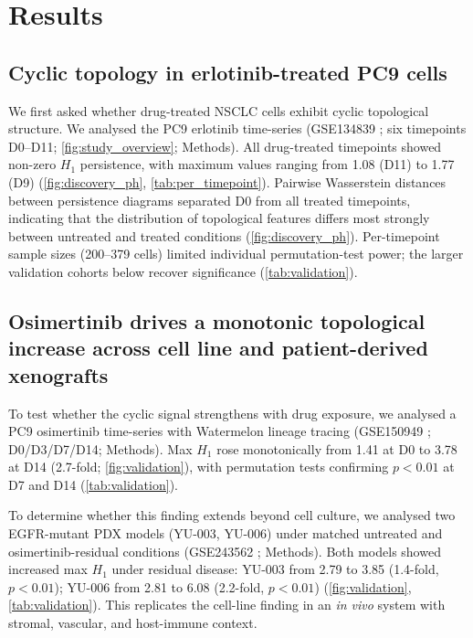 \section{Results}

\subsection*{Cyclic topology in erlotinib-treated PC9 cells}

We first asked whether drug-treated NSCLC cells exhibit cyclic
topological structure. We analysed the PC9 erlotinib time-series
(GSE134839 \citep{aissa2021}; six timepoints D0--D11;
\cref{fig:study_overview}; Methods). All drug-treated timepoints
showed non-zero $H_1$ persistence, with maximum values ranging from
1.08 (D11) to 1.77 (D9) (\cref{fig:discovery_ph},
\cref{tab:per_timepoint}). Pairwise Wasserstein distances between
persistence diagrams separated D0 from all treated timepoints,
indicating that the distribution of topological features differs most
strongly between untreated and treated conditions
(\cref{fig:discovery_ph}). Per-timepoint sample sizes (200--379 cells)
limited individual permutation-test power; the larger validation
cohorts below recover significance (\cref{tab:validation}).

\subsection*{Osimertinib drives a monotonic topological increase across
cell line and patient-derived xenografts}

To test whether the cyclic signal strengthens with drug exposure, we
analysed a PC9 osimertinib time-series with Watermelon lineage tracing
(GSE150949 \citep{oren2021}; D0/D3/D7/D14; Methods). Max $H_1$ rose
monotonically from 1.41 at D0 to 3.78 at D14 (2.7-fold;
\cref{fig:validation}), with permutation tests confirming
$p < 0.01$ at D7 and D14 (\cref{tab:validation}).

To determine whether this finding extends beyond cell culture, we
analysed two EGFR-mutant PDX models (YU-003, YU-006) under matched
untreated and osimertinib-residual conditions (GSE243562
\citep{wurtz2024}; Methods). Both models showed increased max $H_1$
under residual disease: YU-003 from 2.79 to 3.85 (1.4-fold,
$p < 0.01$); YU-006 from 2.81 to 6.08 (2.2-fold, $p < 0.01$)
(\cref{fig:validation}, \cref{tab:validation}). This replicates the
cell-line finding in an \emph{in vivo} system with stromal, vascular,
and host-immune context.

